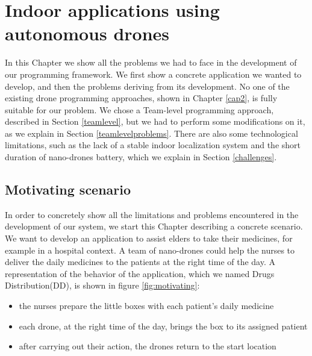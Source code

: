 \chapter{Indoor applications using autonomous drones}
\label{cap3}

In this Chapter we show all the problems we had to face in the development of our programming framework. 
We first show a concrete application we wanted to develop, and then the problems deriving from its development.
No one of the existing drone programming approaches, shown in Chapter \ref{cap2}, is fully suitable for our problem.
We chose a Team-level programming approach, described in Section \ref{teamlevel}, but we had to perform some modifications on it, as we explain in Section \ref{teamlevelproblems}.
There are also some technological limitations, such as the lack of a stable indoor localization system and the short duration of nano-drones battery, which we explain in Section \ref{challenges}.

\section{Motivating scenario\label{motivating}}

In order to concretely show all the limitations and problems encountered in the development of our system, we start this Chapter describing a concrete scenario.
We want to develop an application to assist elders to take their medicines, for example in a hospital context.
A team of nano-drones could help the nurses to deliver the daily medicines to the patients at the right time of the day.
A representation of the behavior of the application, which we named Drugs Distribution(DD), is shown in figure \ref{fig:motivating}:

\newpage

\begin{itemize}
\itemsep2pt
\item{
the nurses prepare the little boxes with each patient’s daily medicine
}
\item{
each drone, at the right time of the day, brings the box to its assigned patient
}
\item{
after carrying out their action, the drones return to the start location
}

\end{itemize}


